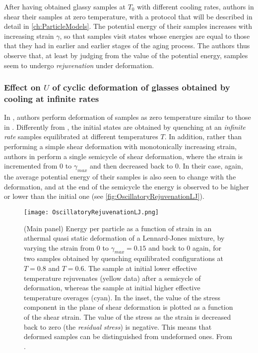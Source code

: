 After having obtained glassy samples at $T_{0}$ with different cooling rates, authors in \cite{utz2000atomistic} shear their samples at zero temperature, with a protocol that will be described in detail in \autoref{ch:ParticleModels}. The potential energy of their samples increases with increasing strain $\gamma$, so that samples visit states whose energies are equal to those that they had in earlier and earlier stages of the aging process. The authors thus observe that, at least by judging from the value of the potential energy, samples seem to undergo \emph{rejuvenation} under deformation.

\subsubsection{Effect on $U$ of cyclic deformation of glasses obtained by cooling at infinite rates}

In \cite{lacks2004energy}, authors perform deformation of samples as zero temperature similar to those in \cite{utz2000atomistic}. Differently from \cite{utz2000atomistic}, the initial states are obtained by quenching at an \emph{infinite rate} samples equilibrated at different temperatures $T$.
In addition, rather than performing a simple shear deformation with monotonically increasing strain, authors in \cite{lacks2004energy} perform a single semicycle of shear deformation, where the strain is incremented from 0 to $\gamma_{max}$ and then decreased back to 0. In their case, again, the average potential energy of their samples is also seen to change with the deformation, and at the end of the semicycle the energy is observed to be higher or lower than the initial one (see \autoref{fig:OscillatoryRejuvenationLJ}).
\begin{figure} 
\centering 
\texttt{[image: OscillatoryRejuvenationLJ.png]} 
\caption{(Main panel) Energy per particle as a function of strain in an athermal quasi static deformation of a Lennard-Jones mixture, by varying the strain from 0 to $\gamma_{max} = 0.15$ and back to 0 again, for two samples obtained by quenching equilibrated configurations at $T=0.8$ and $T=0.6$. The sample at initial lower effective temperature rejuvenates (yellow data) after a semicycle of deformation, whereas the sample at initial higher effective temperature overages (cyan). In the inset, the value of the stress component in the plane of shear deformation is plotted as a function of the shear strain. The value of the stress as the strain is decreased back to zero (the \emph{residual stress}) is negative. This means that deformed samples can be distinguished from undeformed ones. From \cite{lacks2004energy}. \label{fig:OscillatoryRejuvenationLJ}}
\end{figure}

